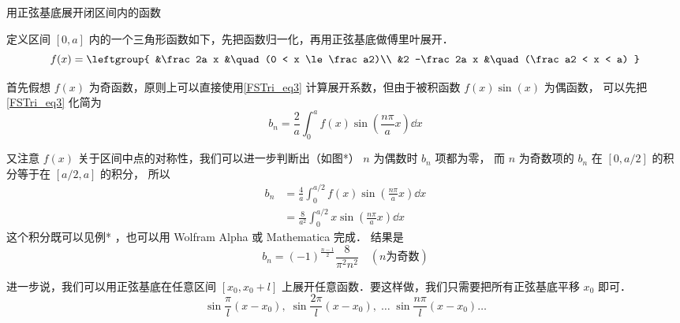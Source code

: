 \begin{exam}{用正弦基底展开闭区间内的函数}

定义区间 $[0,a]$ 内的一个三角形函数如下，先把函数归一化，再用正弦基底做傅里叶展开．
\begin{equation}
f(x) = \leftgroup{
&\frac 2a x &\quad (0 < x \le \frac a2)\\
&2 -\frac 2a x &\quad (\frac a2 < x < a)
}\end{equation}

首先假想 $f(x)$ 为奇函数，原则上可以直接使用\autoref{FSTri_eq3} 计算展开系数，但由于被积函数 $f(x)\sin(x)$ 为偶函数， 可以先把\autoref{FSTri_eq3} 化简为%
\begin{equation}
{b_n} = \frac{2}{a}\int_{0}^a f( x )\sin (\frac{n\pi}{a}x) \dd{x}
\end{equation}


又注意 $f(x)$ 关于区间中点的对称性，我们可以进一步判断出（如图*） $n$ 为偶数时 $b_n$ 项都为零， 而 $n$ 为奇数项的 $b_n$ 在 $[0,a/2]$ 的积分等于在 $[a/2,a]$ 的积分， 所以
\begin{equation}\begin{aligned}
{b_n} &= \frac{4}{a}\int_{0}^{a/2} f( x )\sin (\frac{n\pi}{a}x) \dd{x}\\
&= \frac{8}{a^2} \int_{0}^{a/2} x\sin (\frac{n\pi}{a}x) \dd{x}
\end{aligned}\end{equation}
这个积分既可以见例*%
，也可以用 Wolfram Alpha 或 Mathematica 完成．%
结果是
\begin{equation}
b_n = (-1)^{\frac{n-1}{2}} \frac{8}{\pi^2 n^2} \quad (n\text{为奇数})
\end{equation}

\end{exam}

进一步说，我们可以用正弦基底在任意区间 $[x_0,x_0+l]$ 上展开任意函数．要这样做，我们只需要把所有正弦基底平移 $x_0$ 即可．
\begin{equation}
\sin\frac{\pi}{l} (x-x_0),\;   \sin\frac{2\pi}{l} (x-x_0),\;    \dots\;\sin\frac{n\pi}{l} (x-x_0) \dots
\end{equation}


